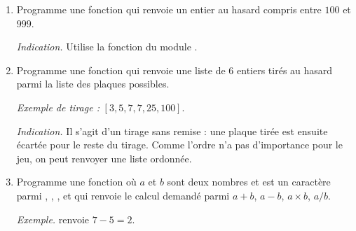 \documentclass[11pt,class=report,crop=false]{standalone}
\begin{document}
\begin{activite}[Tirage]
   
 
\begin{enumerate}
  \item Programme une fonction  qui renvoie un entier au hasard compris entre $100$ et $999$.
  
  \emph{Indication.} Utilise la fonction  du module .
  
  \item Programme une fonction  qui renvoie une liste de $6$ entiers tirés au hasard 
  parmi la liste des plaques possibles. 
  
  \emph{Exemple de tirage :} $[3,5,7,7,25,100]$.
     
  \emph{Indication.} Il s'agit d'un tirage sans remise : une plaque tirée est ensuite écartée pour le reste du tirage.
  Comme l'ordre n'a pas d'importance pour le jeu, on peut renvoyer une liste ordonnée.
  
  
  \item Programme une fonction  où $a$ et $b$ sont deux nombres et  est un caractère parmi , , ,  et qui renvoie le calcul demandé parmi $a+b$, $a-b$, $a \times b$, $a/b$.
  
  \emph{Exemple.}  renvoie $7-5=2$.
  
\end{enumerate}

\end{activite}



\end{document}
